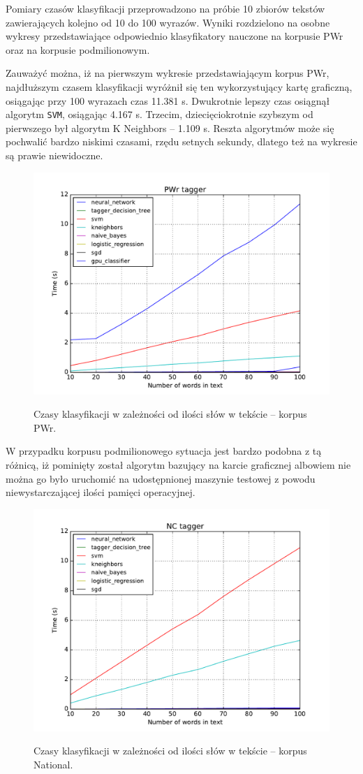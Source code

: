 Pomiary czasów klasyfikacji przeprowadzono na próbie 10 zbiorów tekstów zawierających kolejno od 10 do 100 wyrazów. Wyniki rozdzielono na osobne wykresy przedstawiające odpowiednio klasyfikatory nauczone na korpusie PWr oraz na korpusie podmilionowym.

Zauważyć można, iż na pierwszym wykresie przedstawiającym korpus PWr, najdłuższym czasem klasyfikacji wyróżnił się ten wykorzystujący kartę graficzną, osiągając przy 100 wyrazach czas 11.381 s. Dwukrotnie lepszy czas osiągnął algorytm \texttt{SVM}, osiągając 4.167 s. Trzecim, dziecięciokrotnie szybszym od pierwszego był algorytm K Neighbors -- 1.109 s. Reszta algorytmów może się pochwalić bardzo niskimi czasami, rzędu setnych sekundy, dlatego też na wykresie są prawie niewidoczne.

\begin{figure}[!htbp]
	\centering
	\includegraphics[scale=0.8]{charts/czasy_pwr.pdf}
	\label{Rysunek}
	\caption{Czasy klasyfikacji w zależności od ilości słów w tekście -- korpus PWr.}
\end{figure}

W przypadku korpusu podmilionowego sytuacja jest bardzo podobna z tą różnicą, iż pominięty został algorytm bazujący na karcie graficznej albowiem nie można go było uruchomić na udostępnionej maszynie testowej z powodu niewystarczającej ilości pamięci operacyjnej.

\begin{figure}[!htbp]
	\centering
	\includegraphics[scale=0.8]{charts/czasy_nc.pdf}
	\label{Rysunek}
	\caption{Czasy klasyfikacji w zależności od ilości słów w tekście -- korpus National.}
\end{figure}
